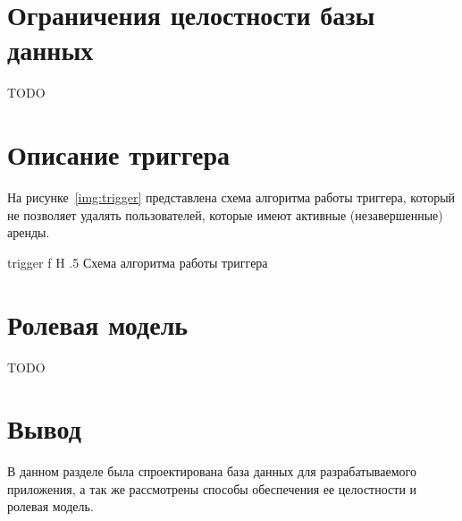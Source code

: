 \section{Ограничения целостности базы данных}

TODO

\section{Описание триггера}

На рисунке~\ref{img:trigger} представлена схема алгоритма работы триггера, который не позволяет удалять пользователей, которые имеют активные (незавершенные) аренды.

    {trigger}
    {f}
    {H}
    {.5\textwidth}
    {Схема алгоритма работы триггера}

\section{Ролевая модель}

TODO

\section*{Вывод}

В данном разделе была спроектирована база данных для разрабатываемого приложения, а так же рассмотрены способы обеспечения ее целостности и ролевая модель.